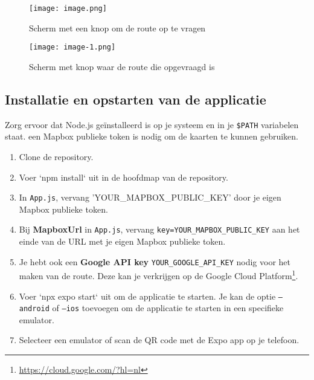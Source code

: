 \begin{figure}[htbp]
    \centering
    \begin{minipage}[b]{0.45\textwidth}
        \centering
        \texttt{[image: image.png]}
        \caption{Scherm met een knop om de route op te vragen}
        \label{fig:Scherm met een knop om de route op te vragen}
    \end{minipage}
    \hspace{0.05\textwidth}
    \begin{minipage}[b]{0.45\textwidth}
        \centering
        \texttt{[image: image-1.png]}
        \caption{Scherm met knop waar de route die opgevraagd is}
        \label{fig:Scherm met knop waar route die opgevraagd is}
    \end{minipage}
\end{figure}

\subsection{Installatie en opstarten van de applicatie}
\label{sec:installatie en opstarten van de applicatie}

Zorg ervoor dat Node.js geïnstalleerd is op je systeem en in je \texttt{\$PATH} variabelen staat.
een Mapbox publieke token is nodig om de kaarten te kunnen gebruiken.

\begin{enumerate}
    \item Clone de repository.
    \item Voer `npm install` uit in de hoofdmap van de repository.
    \item In \texttt{App.js}, vervang 'YOUR\_MAPBOX\_PUBLIC\_KEY' door je eigen Mapbox publieke token.
    \item Bij \textbf{MapboxUrl} in \texttt{App.js}, vervang \texttt{key=YOUR\_MAPBOX\_PUBLIC\_KEY} aan het einde van de URL met je eigen Mapbox publieke token.
    \item Je hebt ook een \textbf{Google API key} \texttt{YOUR\_GOOGLE\_API\_KEY} nodig voor het maken van de route. Deze kan je verkrijgen op de Google Cloud Platform\footnote{\url{https://cloud.google.com/?hl=nl}}.
    \item Voer `npx expo start` uit om de applicatie te starten. Je kan de optie \texttt{--android} of \texttt{--ios} toevoegen om de applicatie te starten in een specifieke emulator.
    \item Selecteer een emulator of scan de QR code met de Expo app op je telefoon.
\end{enumerate}

